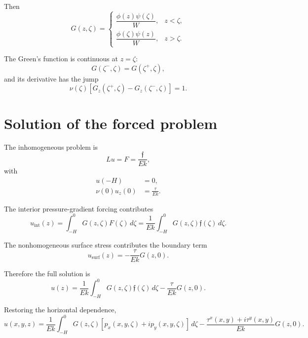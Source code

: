 \documentclass[10pt]{amsart}
\begin{document}
Then
\begin{equation}
G(z,\zeta)
=
\begin{cases}
\dfrac{\phi(z)\psi(\zeta)}{W},
& z<\zeta,\\[1.2em]
\dfrac{\phi(\zeta)\psi(z)}{W},
& z>\zeta.
\end{cases}
\label{eq:green}
\end{equation}

The Green's function is continuous at \(z=\zeta\):
\begin{equation}
G(\zeta^-,\zeta)=G(\zeta^+,\zeta),
\end{equation}
and its derivative has the jump
\begin{equation}
\nu(\zeta)
\left[
G_z(\zeta^+,\zeta)-G_z(\zeta^-,\zeta)
\right]
=
1.
\label{eq:jump}
\end{equation}

\section{Solution of the forced problem}

The inhomogeneous problem is
\begin{equation}
L u=F
=
\frac{\mathfrak f}{E k},
\label{eq:forced_problem}
\end{equation}
with
\begin{align}
u(-H)&=0,\\
\nu(0)u_z(0)&=\frac{\tau}{E k}.
\end{align}

The interior pressure-gradient forcing contributes
\begin{equation}
u_{\mathrm{int}}(z)
=
\int_{-H}^{0}
G(z,\zeta)F(\zeta)\,d\zeta
=
\frac{1}{E k}
\int_{-H}^{0}
G(z,\zeta)\mathfrak f(\zeta)\,d\zeta.
\label{eq:interior_solution}
\end{equation}

The nonhomogeneous surface stress contributes the boundary term
\begin{equation}
u_{\mathrm{surf}}(z)
=
-\frac{\tau}{E k}G(z,0).
\label{eq:surface_solution}
\end{equation}

Therefore the full solution is
\begin{equation}
\boxed{
u(z)
=
\frac{1}{E k}
\int_{-H}^{0}
G(z,\zeta)\mathfrak f(\zeta)\,d\zeta
-
\frac{\tau}{E k}G(z,0).
}
\label{eq:solution_z}
\end{equation}

Restoring the horizontal dependence,
\begin{equation}
\boxed{
u(x,y,z)
=
\frac{1}{E k}
\int_{-H}^{0}
G(z,\zeta)
\left[
p_x(x,y,\zeta)+i p_y(x,y,\zeta)
\right]\,d\zeta
-
\frac{\tau^x(x,y)+i\tau^y(x,y)}{E k}
G(z,0).
}
\label{eq:solution_full}
\end{equation}
\end{document}
